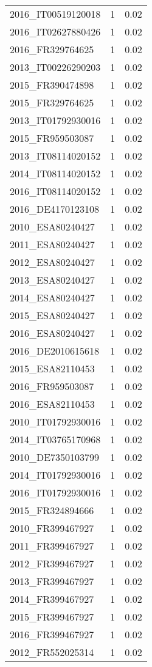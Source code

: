\begin{table*}[htbp]
\begin{tabular}{lrr}
2016_IT00519120018 & 1 & 0.02 \\
2016_IT02627880426 & 1 & 0.02 \\
2016_FR329764625 & 1 & 0.02 \\
2013_IT00226290203 & 1 & 0.02 \\
2015_FR390474898 & 1 & 0.02 \\
2015_FR329764625 & 1 & 0.02 \\
2013_IT01792930016 & 1 & 0.02 \\
2015_FR959503087 & 1 & 0.02 \\
2013_IT08114020152 & 1 & 0.02 \\
2014_IT08114020152 & 1 & 0.02 \\
2016_IT08114020152 & 1 & 0.02 \\
2016_DE4170123108 & 1 & 0.02 \\
2010_ESA80240427 & 1 & 0.02 \\
2011_ESA80240427 & 1 & 0.02 \\
2012_ESA80240427 & 1 & 0.02 \\
2013_ESA80240427 & 1 & 0.02 \\
2014_ESA80240427 & 1 & 0.02 \\
2015_ESA80240427 & 1 & 0.02 \\
2016_ESA80240427 & 1 & 0.02 \\
2016_DE2010615618 & 1 & 0.02 \\
2015_ESA82110453 & 1 & 0.02 \\
2016_FR959503087 & 1 & 0.02 \\
2016_ESA82110453 & 1 & 0.02 \\
2010_IT01792930016 & 1 & 0.02 \\
2014_IT03765170968 & 1 & 0.02 \\
2010_DE7350103799 & 1 & 0.02 \\
2014_IT01792930016 & 1 & 0.02 \\
2016_IT01792930016 & 1 & 0.02 \\
2015_FR324894666 & 1 & 0.02 \\
2010_FR399467927 & 1 & 0.02 \\
2011_FR399467927 & 1 & 0.02 \\
2012_FR399467927 & 1 & 0.02 \\
2013_FR399467927 & 1 & 0.02 \\
2014_FR399467927 & 1 & 0.02 \\
2015_FR399467927 & 1 & 0.02 \\
2016_FR399467927 & 1 & 0.02 \\
2012_FR552025314 & 1 & 0.02 \\

\end{tabular}
\end{table*}
